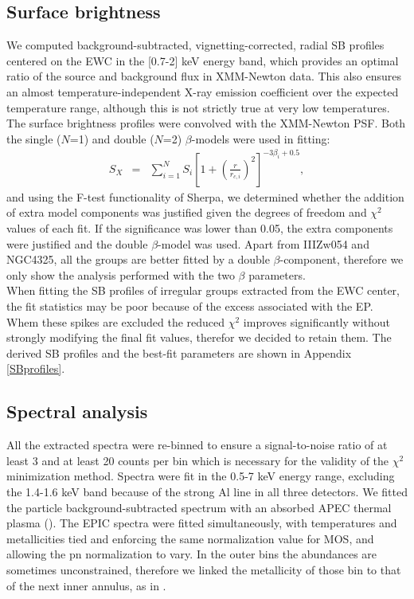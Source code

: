 \documentclass{aa} %
\begin{document}
\subsection{Surface brightness}
We computed background-subtracted, vignetting-corrected, radial
SB profiles centered on the EWC in the [0.7-2] keV energy band, which provides an optimal ratio of the source and background flux in XMM-Newton data. This also 
ensures an almost temperature-independent X-ray emission coefficient
over the expected temperature range, although 
this is not strictly true at very low temperatures. The surface brightness profiles were 
convolved with the XMM-Newton PSF.  Both the single
($N$=1) and double ($N$=2) $\beta$-models were used in fitting:
\begin{eqnarray}
S_X &=& \displaystyle\sum_{i=1}^N S_i
\left[1+\left(\frac{r}{r_{c,i}}\right)^2\right]^{-3\beta_i+0.5},
\end{eqnarray}
and using the F-test functionality of Sherpa, we determined whether the
addition of extra model components was justified given the degrees of
freedom and $\chi^2$ values of each fit. If the significance was lower
than 0.05, the extra components were justified and the double
$\beta$-model was used. Apart from IIIZw054 and NGC4325, all the groups are better
fitted by a double $\beta$-component, therefore we only show the
analysis performed with the two $\beta$ parameters.\\
When fitting the SB profiles of irregular groups extracted from the
EWC center, the fit statistics may be poor because of the excess associated
with the EP. Whem these spikes are excluded the reduced $\chi^2$ improves significantly 
without strongly modifying the final fit values, therefor we decided to retain them. The derived SB profiles and the best-fit parameters are shown in Appendix \ref{SBprofiles}.

\subsection{Spectral analysis}
All the extracted spectra were re-binned to ensure a signal-to-noise
ratio of at least 3 and at least 20 counts per bin which is necessary for the
validity of the $\chi^2$ minimization method.  Spectra were fit
in the 0.5-7 keV energy range, excluding the 1.4-1.6 keV band because of
the strong Al line in all three detectors.  We fitted the particle
background-subtracted spectrum with an absorbed APEC thermal plasma
(\citealt{2001ApJ...556L..91S}). The EPIC spectra were fitted
simultaneously, with temperatures and metallicities tied and enforcing
the same normalization value for MOS, and allowing the pn normalization
to vary. In the outer bins the abundances are sometimes unconstrained, 
therefore we linked the metallicity of those bin to that of the next inner
annulus, as in \citet{2008A&A...478..615S}.
\end{document}
